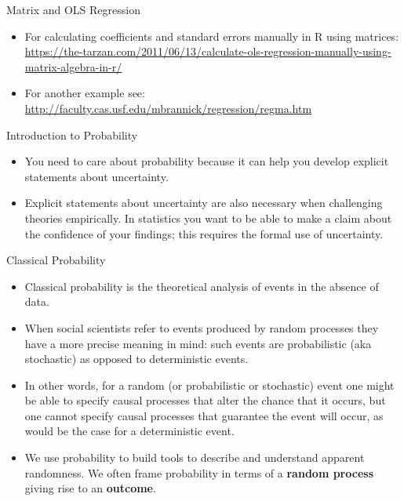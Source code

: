 \documentclass[
  ignorenonframetext,
]{beamer}
\begin{document}
\begin{frame}{Matrix and OLS Regression}
\protect\hypertarget{matrix-and-ols-regression}{}

\begin{itemize}
\item
  For calculating coefficients and standard errors manually in R using
  matrices:
  \url{https://the-tarzan.com/2011/06/13/calculate-ols-regression-manually-using-matrix-algebra-in-r/}
\item
  For another example see:
  \url{http://faculty.cas.usf.edu/mbrannick/regression/regma.htm}
\end{itemize}

\end{frame}

\begin{frame}{Introduction to Probability}
\protect\hypertarget{introduction-to-probability}{}

\begin{itemize}
\item
  You need to care about probability because it can help you develop
  explicit statements about uncertainty.
\item
  Explicit statements about uncertainty are also necessary when
  challenging theories empirically. In statistics you want to be able to
  make a claim about the confidence of your findings; this requires the
  formal use of uncertainty.
\end{itemize}

\end{frame}

\begin{frame}{Classical Probability}
\protect\hypertarget{classical-probability}{}

\begin{itemize}
\item
  Classical probability is the theoretical analysis of events in the
  absence of data.
\item
  When social scientists refer to events produced by random processes
  they have a more precise meaning in mind: such events are
  probabilistic (aka stochastic) as opposed to deterministic events.
\item
  In other words, for a random (or probabilistic or stochastic) event
  one might be able to specify causal processes that alter the chance
  that it occurs, but one cannot specify causal processes that guarantee
  the event will occur, as would be the case for a deterministic event.
\item
  We use probability to build tools to describe and understand apparent
  randomness. We often frame probability in terms of a \textbf{random
  process} giving rise to an \textbf{outcome}.
\end{itemize}

\end{frame}
\end{document}
